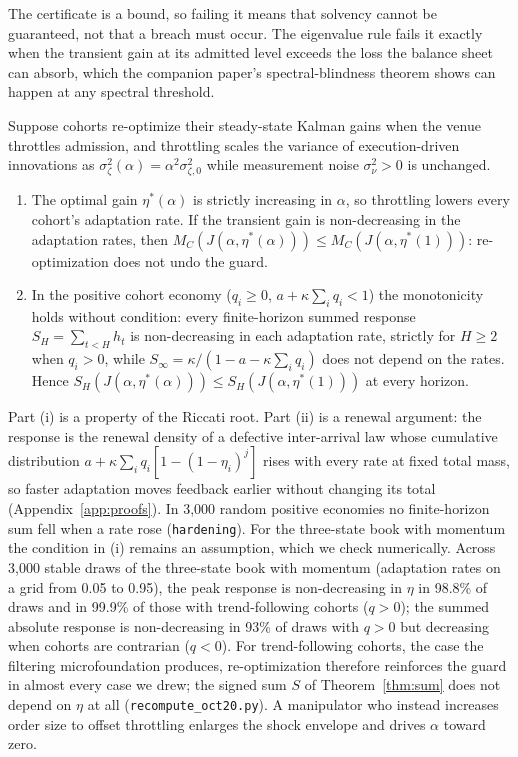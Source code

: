 The certificate is a bound, so failing it means that solvency cannot be guaranteed, not that a breach must occur. The eigenvalue rule fails it exactly when the transient gain at its admitted level exceeds the loss the balance sheet can absorb, which the companion paper's spectral-blindness theorem shows can happen at any spectral threshold.

\begin{proposition}\label{prop:lucas}
Suppose cohorts re-optimize their steady-state Kalman gains when the venue throttles admission, and throttling scales the variance of execution-driven innovations as $\sigma_\zeta^2(\alpha)=\alpha^2\sigma_{\zeta,0}^2$ while measurement noise $\sigma_\nu^2>0$ is unchanged.
\begin{enumerate}[label=(\roman*)]
\item The optimal gain $\eta^*(\alpha)$ is strictly increasing in $\alpha$, so throttling lowers every cohort's adaptation rate. If the transient gain is non-decreasing in the adaptation rates, then $M_C(J(\alpha,\eta^*(\alpha)))\le M_C(J(\alpha,\eta^*(1)))$: re-optimization does not undo the guard.
\item In the positive cohort economy ($q_i\ge0$, $a+\kappa\sum_iq_i<1$) the monotonicity holds without condition: every finite-horizon summed response $S_H=\sum_{t<H}h_t$ is non-decreasing in each adaptation rate, strictly for $H\ge2$ when $q_i>0$, while $S_\infty=\kappa/(1-a-\kappa\sum_iq_i)$ does not depend on the rates. Hence $S_H(J(\alpha,\eta^*(\alpha)))\le S_H(J(\alpha,\eta^*(1)))$ at every horizon.
\end{enumerate}
\end{proposition}

Part (i) is a property of the Riccati root. Part (ii) is a renewal argument: the response is the renewal density of a defective inter-arrival law whose cumulative distribution $a+\kappa\sum_iq_i[1-(1-\eta_i)^j]$ rises with every rate at fixed total mass, so faster adaptation moves feedback earlier without changing its total (Appendix~\ref{app:proofs}). In 3{,}000 random positive economies no finite-horizon sum fell when a rate rose (\texttt{hardening}). For the three-state book with momentum the condition in (i) remains an assumption, which we check numerically. Across 3{,}000 stable draws of the three-state book with momentum (adaptation rates on a grid from 0.05 to 0.95), the peak response is non-decreasing in $\eta$ in 98.8\% of draws and in 99.9\% of those with trend-following cohorts ($q>0$); the summed absolute response is non-decreasing in 93\% of draws with $q>0$ but decreasing when cohorts are contrarian ($q<0$). For trend-following cohorts, the case the filtering microfoundation produces, re-optimization therefore reinforces the guard in almost every case we drew; the signed sum $S$ of Theorem~\ref{thm:sum} does not depend on $\eta$ at all (\texttt{recompute\_oct20.py}). A manipulator who instead increases order size to offset throttling enlarges the shock envelope and drives $\alpha$ toward zero.
